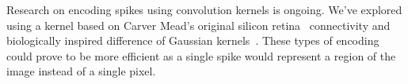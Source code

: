 \documentclass[twocolumn, a4paper]{article}
\begin{document}
Research on encoding spikes using convolution kernels is ongoing. We've explored using a kernel based on Carver Mead's original silicon retina~\cite{Mead1989} connectivity and biologically inspired difference of Gaussian kernels~\cite{basab}. These types of encoding could prove to be more efficient as a single spike would represent a region of the image instead of a single pixel.

\printbibliography
\end{document}
